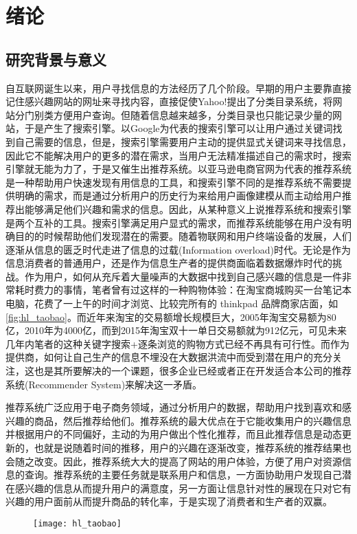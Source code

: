 ﻿
\chapter{绪论}
\label{chap:introduction}
\section{研究背景与意义}
	自互联网诞生以来，用户寻找信息的方法经历了几个阶段。早期的用户主要靠直接记住感兴趣网站的网址来寻找内容，直接促使Yahoo!提出了分类目录系统，将网站分门别类方便用户查询。但随着信息越来越多，分类目录也只能记录少量的网站，于是产生了搜索引擎。以Google为代表的搜索引擎可以让用户通过关键词找到自己需要的信息，但是，搜索引擎需要用户主动的提供显式关键词来寻找信息，因此它不能解决用户的更多的潜在需求，当用户无法精准描述自己的需求时，搜索引擎就无能为力了，于是又催生出推荐系统\citep{recmd-system}。以亚马逊电商官网为代表的推荐系统是一种帮助用户快速发现有用信息的工具，和搜索引擎不同的是推荐系统不需要提供明确的需求，而是通过分析用户的历史行为来给用户画像建模从而主动给用户推荐出能够满足他们兴趣和需求的信息。因此，从某种意义上说推荐系统和搜索引擎是两个互补的工具。搜索引擎满足用户显式的需求，而推荐系统能够在用户没有明确目的的时候帮助他们发现潜在的需要。随着物联网和用户终端设备的发展，人们逐渐从信息的匮乏时代走进了信息的过载(Information overload)时代。无论是作为信息消费者的普通用户，还是作为信息生产者的提供商面临着数据爆炸时代的挑战。作为用户，如何从充斥着大量噪声的大数据中找到自己感兴趣的信息是一件非常耗时费力的事情，笔者曾有过这样的一种购物体验：在淘宝商城购买一台笔记本电脑，花费了一上午的时间才浏览、比较完所有的 thinkpad 品牌商家店面，如\autoref{fig:hl_taobao}。而近年来淘宝的交易额增长规模巨大，2005年淘宝交易额为80亿，2010年为4000亿，而到2015年淘宝双十一单日交易额就为912亿元，可见未来几年内笔者的这种关键字搜索+逐条浏览的购物方式已经不再具有可行性。而作为提供商，如何让自己生产的信息不埋没在大数据洪流中而受到潜在用户的充分关注，这也是其所要解决的一个课题，很多企业已经或者正在开发适合本公司的推荐系统(Recommender System)来解决这一矛盾。

	推荐系统广泛应用于电子商务领域，通过分析用户的数据，帮助用户找到喜欢和感兴趣的商品，然后推荐给他们。推荐系统的最大优点在于它能收集用户的兴趣信息并根据用户的不同偏好，主动的为用户做出个性化推荐，而且此推荐信息是动态更新的，也就是说随着时间的推移，用户的兴趣在逐渐改变，推荐系统的推荐结果也会随之改变。因此，推荐系统大大的提高了网站的用户体验，方便了用户对资源信息的查询。推荐系统的主要任务就是联系用户和信息，一方面协助用户发现自己潜在感兴趣的信息从而提升用户的满意度，另一方面让信息针对性的展现在只对它有兴趣的用户面前从而提升商品的转化率，于是实现了消费者和生产者的双赢。
	\begin{figure}
		\centering
		\texttt{[image: hl\_taobao]}
		\label{fig:hl_taobao}
	\end{figure}


